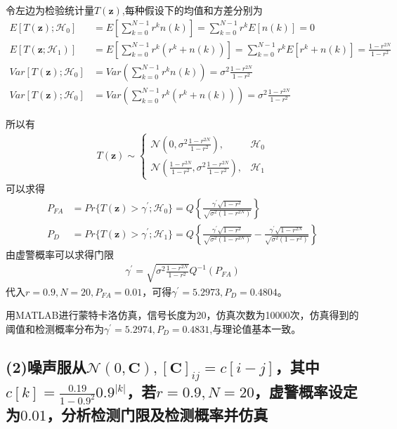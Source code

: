 \documentclass[fontset=windows]{article}
\numberwithin{figure}{section}
\begin{document}
令左边为检验统计量\(T(\mathbf{z})\),每种假设下的均值和方差分别为
\begin{align*}
    E[T(\mathbf{z});\mathcal{H}_0]   & =E\left[\sum_{k=0}^{N-1}r^kn(k)\right]=\sum_{k=0}^{N-1}r^kE[n(k)]=0                                \\
    E[T(\mathbf{z};\mathcal{H}_1)]   & =E\left[\sum_{k=0}^{N-1}r^k(r^k+n(k))\right]=\sum_{k=0}^{N-1}r^kE[r^k+n(k)]=\frac{1-r^{2N}}{1-r^2} \\
    Var[T(\mathbf{z});\mathcal{H}_0] & =Var\left(\sum_{k=0}^{N-1}r^kn(k)\right)=\sigma^2\frac{1-r^{2N}}{1-r^2}                            \\
    Var[T(\mathbf{z});\mathcal{H}_0] & =Var\left(\sum_{k=0}^{N-1}r^k(r^k+n(k))\right)=\sigma^2\frac{1-r^{2N}}{1-r^2}
\end{align*}

所以有
\begin{align*}
    T(\mathbf{z})\sim\left\{
    \begin{matrix}
        \mathcal{N}(0,\sigma^2\frac{1-r^{2N}}{1-r^2}),                      & \mathcal{H}_0 \\
        \mathcal{N}(\frac{1-r^{2N}}{1-r^2},\sigma^2\frac{1-r^{2N}}{1-r^2}), & \mathcal{H}_1
    \end{matrix}
    \right.
\end{align*}
可以求得
\begin{align*}
    P_{FA} & =Pr\{T(\mathbf{z})>\gamma^{\prime};\mathcal{H}_0\}=Q\left\{\frac{\gamma^{\prime}\sqrt{1-r^2}}{\sqrt{\sigma^2(1-r^{2N})}}\right\}                                                               \\
    P_D    & =Pr\{T(\mathbf{z})>\gamma^{\prime};\mathcal{H}_1\}=Q\left\{\frac{\gamma^{\prime}\sqrt{1-r^2}}{\sqrt{\sigma^2(1-r^{2N})}}-\frac{\gamma^{\prime}\sqrt{1-r^{2N}}}{\sqrt{\sigma^2(1-r^2)}}\right\}
\end{align*}
由虚警概率可以求得门限
\begin{align*}
    \gamma^{\prime}=\sqrt{\sigma^2\frac{1-r^{2N}}{1-r^2}}Q^{-1}(P_{FA})
\end{align*}
代入\(r=0.9,N=20,P_{FA}=0.01\)，可得\(\gamma^{\prime}=5.2973,P_D=0.4804\)。

用MATLAB进行蒙特卡洛仿真，信号长度为20，仿真次数为10000次，仿真得到的阈值和检测概率分布为\(\gamma^{\prime}=5.2974,P_D=0.4831\),与理论值基本一致。

\subsection*{(2)噪声服从\(\mathcal{N}(0,\mathbf{C}),[\mathbf{C}]_{ij}=c[i-j]\)，其中\(c[k]=\frac{0.19}{1-0.9^2}0.9^{|k|}\)，若\(r=0.9,N=20\)，虚警概率设定为\(0.01\)，分析检测门限及检测概率并仿真}
\end{document}
